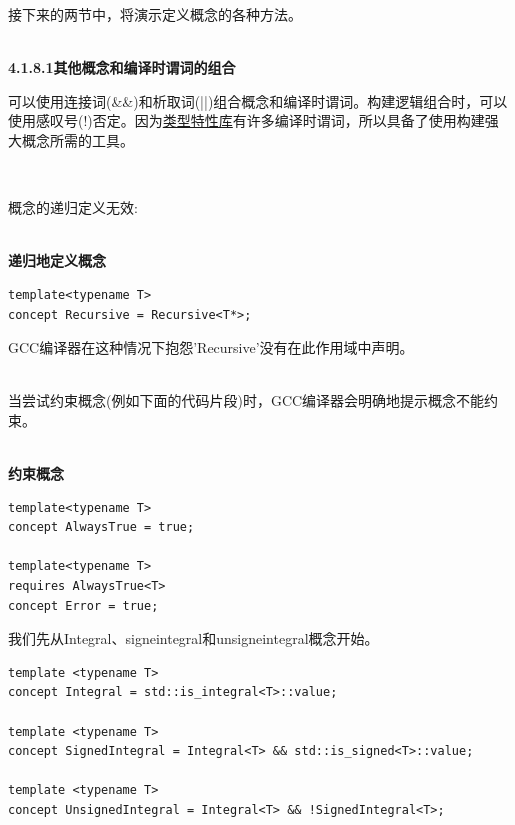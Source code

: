 接下来的两节中，将演示定义概念的各种方法。

\hspace*{\fill} \\ %
\noindent
\textbf{4.1.8.1\hspace{0.2cm}其他概念和编译时谓词的组合}

可以使用连接词(\&\&)和析取词(||)组合概念和编译时谓词。构建逻辑组合时，可以使用感叹号(!)否定。因为\href{https://en.cppreference.com/w/cpp/header/type_traits}{类型特性库}有许多编译时谓词，所以具备了使用构建强大概念所需的工具。

\hspace*{\fill} \\ %
\begin{tcolorbox}[breakable,enhanced jigsaw,colback=red!5!white,colframe=red!75!black,title={不要递归地定义概念或尝试约束它们}]

概念的递归定义无效:

\hspace*{\fill} \\ %
\noindent
\textbf{递归地定义概念}
\begin{lstlisting}[style=styleCXX]
template<typename T>
concept Recursive = Recursive<T*>;
\end{lstlisting}

GCC编译器在这种情况下抱怨'Recursive'没有在此作用域中声明。

\hspace*{\fill} \\ %
当尝试约束概念(例如下面的代码片段)时，GCC编译器会明确地提示概念不能约束。

\hspace*{\fill} \\ %
\noindent
\textbf{约束概念}
\begin{lstlisting}[style=styleCXX]
template<typename T>
concept AlwaysTrue = true;

template<typename T>
requires AlwaysTrue<T>
concept Error = true;
\end{lstlisting}

\end{tcolorbox}

我们先从Integral、signeintegral和unsigneintegral概念开始。

\begin{lstlisting}[style=styleCXX]
template <typename T>
concept Integral = std::is_integral<T>::value;

template <typename T>
concept SignedIntegral = Integral<T> && std::is_signed<T>::value;

template <typename T>
concept UnsignedIntegral = Integral<T> && !SignedIntegral<T>;
\end{lstlisting}

